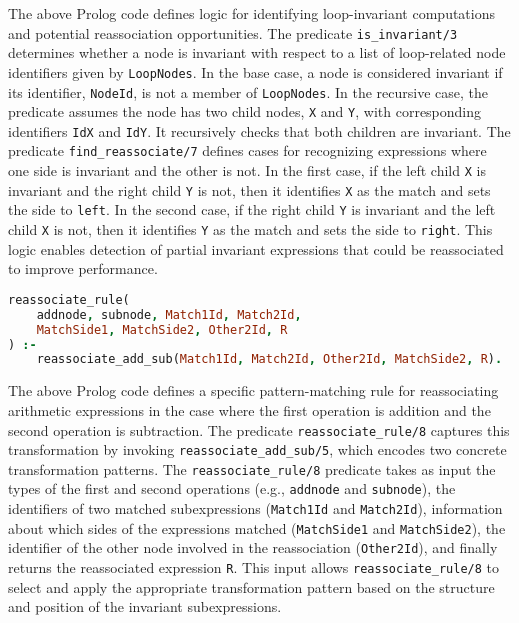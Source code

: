 \smallbreak
The above Prolog code defines logic for identifying loop-invariant computations and potential reassociation opportunities. The predicate \texttt{is\_invariant/3} determines whether a node is invariant with respect to a list of loop-related node identifiers given by \texttt{LoopNodes}. In the base case, a node is considered invariant if its identifier, \texttt{NodeId}, is not a member of \texttt{LoopNodes}. In the recursive case, the predicate assumes the node has two child nodes, \texttt{X} and \texttt{Y}, with corresponding identifiers \texttt{IdX} and \texttt{IdY}. It recursively checks that both children are invariant. The predicate \texttt{find\_reassociate/7} defines cases for recognizing expressions where one side is invariant and the other is not. In the first case, if the left child \texttt{X} is invariant and the right child \texttt{Y} is not, then it identifies \texttt{X} as the match and sets the side to \texttt{left}. In the second case, if the right child \texttt{Y} is invariant and the left child \texttt{X} is not, then it identifies \texttt{Y} as the match and sets the side to \texttt{right}. 
This logic enables detection of partial invariant expressions that could be reassociated to improve performance.

\smallbreak
\begin{lstlisting}[language=Prolog]
% Rule for addnode with subnode
reassociate_rule(
    addnode, subnode, Match1Id, Match2Id, 
    MatchSide1, MatchSide2, Other2Id, R
) :-
    reassociate_add_sub(Match1Id, Match2Id, Other2Id, MatchSide2, R).
\end{lstlisting}
\smallbreak
The above Prolog code defines a specific pattern-matching rule for reassociating arithmetic expressions in the case where the first operation is addition and the second operation is subtraction. The predicate \texttt{reassociate\_rule/8} captures this transformation by invoking \texttt{reassociate\_add\_sub/5}, which encodes two concrete transformation patterns.
The \texttt{reassociate\_rule/8} predicate takes as input the types of the first and second operations (e.g., \texttt{addnode} and \texttt{subnode}), the identifiers of two matched subexpressions (\texttt{Match1Id} and \texttt{Match2Id}), information about which sides of the expressions matched (\texttt{MatchSide1} and \texttt{MatchSide2}), the identifier of the other node involved in the reassociation (\texttt{Other2Id}), and finally returns the reassociated expression \texttt{R}. This input allows \texttt{reassociate\_rule/8} to select and apply the appropriate transformation pattern based on the structure and position of the invariant subexpressions.

